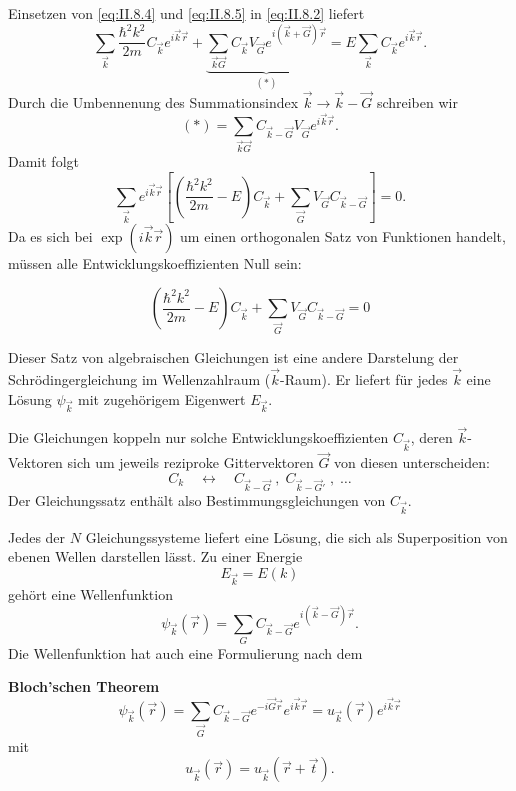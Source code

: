 Einsetzen von \eqref{eq:II.8.4} und \eqref{eq:II.8.5} in \eqref{eq:II.8.2} liefert
$$
\sum_{\Vec{k} }^{} \frac{\hbar ^2 k^2}{2m} C_{\Vec{k}} e^{i \Vec{k} \Vec{r}} + \underbrace{\sum_{\Vec{k} \Vec{G}}^{} C_{\Vec{k}} V_{\Vec{G}} e^{i (\Vec{k} + \Vec{G}) \Vec{r}}}_{(\ast)}= E \sum_{\Vec{k}}^{}  C_{\Vec{k}} e^{i\Vec{k}\Vec{r}}.
$$ 
Durch die Umbennenung des Summationsindex $\Vec{k} \to \Vec{k} -\Vec{G}$ schreiben wir
$$
(\ast) = \sum_{\Vec{k} \Vec{G}}^{} C_{\Vec{k} - \Vec{G}} V_{\Vec{G}} e^{i\Vec{k} \Vec{r}}.
$$ 
Damit folgt
\begin{equation}
	\label{eq:II.8.6}
	\sum_{\Vec{k} }^{} e^{i\Vec{k} \Vec{r}} \left[ \left( \frac{\hbar ^2 k^2}{2m} - E \right) C_{\Vec{k}} + \sum_{\Vec{G} }^{}  V_{\Vec{G}} C_{\Vec{k} -\Vec{G}}  \right] = 0.
\end{equation}
Da es sich bei $\exp(i\Vec{k}\Vec{r})$ um einen orthogonalen Satz von Funktionen handelt, müssen alle Entwicklungskoeffizienten Null sein:

\begin{important}
	$$
	\left( \frac{\hbar ^2 k^2}{2m} - E \right) C_{\Vec{k}} + \sum_{\Vec{G} }^{} V_{\Vec{G}} C_{\Vec{k} -\Vec{G}} = 0  
	$$ 
\end{important}

Dieser Satz von algebraischen Gleichungen ist eine andere Darstelung der Schrödingergleichung im Wellenzahlraum ($\Vec{k}$-Raum).
Er liefert für jedes $\Vec{k}$ eine Lösung $\psi_{\Vec{k}}$ mit zugehörigem Eigenwert $E_{\Vec{k}}$.

Die Gleichungen koppeln nur solche Entwicklungskoeffizienten $C_{\Vec{k}}$, deren $\Vec{k}$-Vektoren sich um jeweils reziproke Gittervektoren $\Vec{G}$ von diesen unterscheiden:
$$
C_{k} \quad\leftrightarrow\quad C_{\Vec{k} - \vec G}\;,\;C_{\Vec{k}- \Vec{G}'}\;,\;\ldots
$$ 
Der Gleichungssatz enthält also Bestimmungsgleichungen von $C_{\vec k}$.

Jedes der $N$ Gleichungssysteme liefert eine Lösung, die sich als Superposition von ebenen Wellen darstellen lässt.
Zu einer Energie
$$E_{\Vec{k}} = E(k)$$
gehört eine Wellenfunktion
\begin{equation}
	\label{eq:II.8.8}
	\psi_{\Vec{k}}(\Vec{r}) = \sum_{G }^{} C_{\Vec{k} -\Vec{G}} e^{i(\Vec{k}-\Vec{G}) \Vec{r}}.
\end{equation} 
Die Wellenfunktion hat auch eine Formulierung nach dem
\begin{important}
	\textbf{Bloch'schen Theorem}
	\vspace{1ex}
	\begin{equation}
		\label{eq:II.8.9}
		\psi_{\Vec{k}} (\Vec{r}) = \sum_{\Vec{G}}^{} C_{\Vec{k} -\Vec{G}} e^{-i \Vec{G}\Vec{r}} e^{i\Vec{k}\Vec{r}} = u_{\Vec{k}} (\Vec{r}) e^{i\Vec{k}\Vec{r}} 
	\end{equation}
	mit 
	\begin{equation}
		\label{eq:II.8.10}
		u_{\Vec{k}}(\Vec{r}) = u_{\Vec{k}}(\Vec{r} + \Vec{t}) .
	\end{equation}
\end{important}

